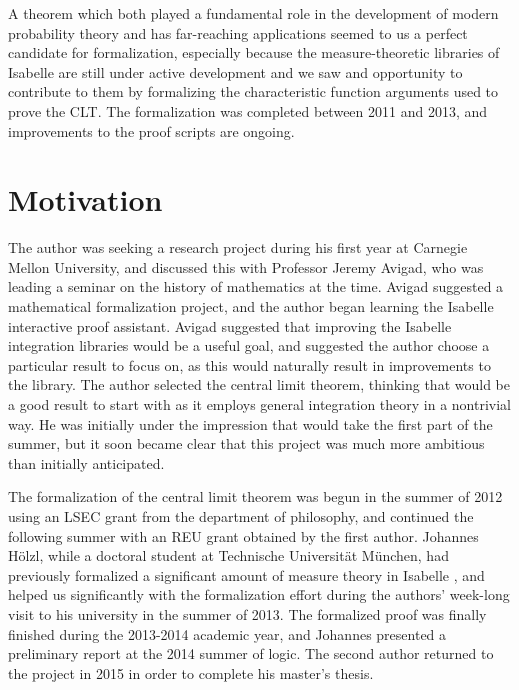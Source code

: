 \documentclass{amsart}
\theoremstyle{definition}
\theoremstyle{remark}
\begin{document}

A theorem which both played a fundamental role in the development of modern probability theory and has far-reaching applications seemed to us a perfect candidate for formalization, especially because the measure-theoretic libraries of Isabelle are still under active development and we saw and opportunity to contribute to them by formalizing the characteristic function arguments used to prove the CLT. The formalization was completed between 2011 and 2013, and improvements to the proof scripts are ongoing.

\section{Motivation}

The author was seeking a research project during his first year at Carnegie Mellon University, and discussed this with Professor Jeremy Avigad, who was leading a seminar on the history of mathematics at the time. Avigad suggested a mathematical formalization project, and the author began learning the Isabelle interactive proof assistant. Avigad suggested that improving the Isabelle integration libraries would be a useful goal, and suggested the author choose a particular result to focus on, as this would naturally result in improvements to the library. The author selected the central limit theorem, thinking that would be a good result to start with as it employs general integration theory in a nontrivial way. He was initially under the impression that would take the first part of the summer, but it soon became clear that this project was much more ambitious than initially anticipated.

The formalization of the central limit theorem was begun in the summer of 2012 using an LSEC grant from the department of philosophy, and continued the following summer with an REU grant obtained by the first author.  Johannes H\"olzl, while a doctoral student at Technische Universit\"at M\"unchen, had previously formalized a significant amount of measure theory in Isabelle \cite{hoelzl-measure}, and helped us significantly with the formalization effort during the authors' week-long visit to his university in the summer of 2013. The formalized proof was finally finished during the 2013-2014 academic year, and Johannes presented a preliminary report at the 2014 summer of logic. The second author returned to the project in 2015 in order to complete his master's thesis.
\end{document}
